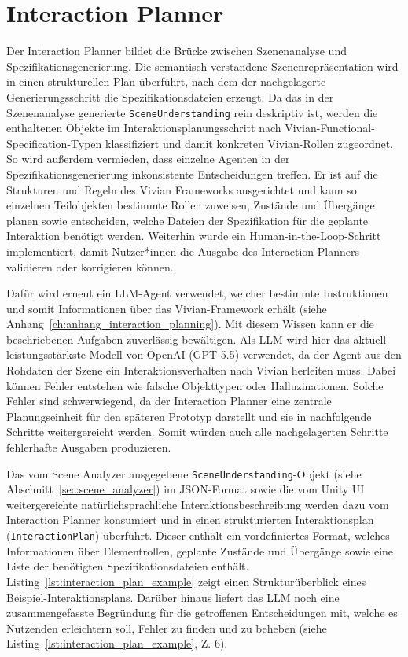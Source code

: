\section{Interaction Planner}\label{sec:interaction_planner}

Der Interaction Planner bildet die Brücke zwischen Szenenanalyse und Spezifikationsgenerierung.
Die semantisch verstandene Szenenrepräsentation wird in einen strukturellen Plan überführt, nach dem der nachgelagerte Generierungsschritt die Spezifikationsdateien erzeugt.
Da das in der Szenenanalyse generierte \texttt{SceneUnderstanding} rein deskriptiv ist, werden die enthaltenen Objekte im Interaktionsplanungsschritt nach Vivian-Functional-Specification-Typen klassifiziert und damit konkreten Vivian-Rollen zugeordnet.
So wird außerdem vermieden, dass einzelne Agenten in der Spezifikationsgenerierung inkonsistente Entscheidungen treffen.
Er ist auf die Strukturen und Regeln des Vivian Frameworks ausgerichtet und kann so einzelnen Teilobjekten bestimmte Rollen zuweisen, Zustände und Übergänge planen sowie entscheiden, welche Dateien der Spezifikation für die geplante Interaktion benötigt werden.
Weiterhin wurde ein Human-in-the-Loop-Schritt implementiert, damit Nutzer*innen die Ausgabe des Interaction Planners validieren oder korrigieren können.

Dafür wird erneut ein LLM-Agent verwendet, welcher bestimmte Instruktionen und somit Informationen über das Vivian-Framework erhält (siehe Anhang~\ref{ch:anhang_interaction_planning}).
Mit diesem Wissen kann er die beschriebenen Aufgaben zuverlässig bewältigen.
Als LLM wird hier das aktuell leistungsstärkste Modell von OpenAI (GPT-5.5) verwendet, da der Agent aus den Rohdaten der Szene ein Interaktionsverhalten nach Vivian herleiten muss.
Dabei können Fehler entstehen wie falsche Objekttypen oder Halluzinationen.
Solche Fehler sind schwerwiegend, da der Interaction Planner eine zentrale Planungseinheit für den späteren Prototyp darstellt und sie in nachfolgende Schritte weitergereicht werden.
Somit würden auch alle nachgelagerten Schritte fehlerhafte Ausgaben produzieren.

Das vom Scene Analyzer ausgegebene \texttt{SceneUnderstanding}-Objekt (siehe Abschnitt~\ref{sec:scene_analyzer}) im JSON-Format sowie die vom Unity UI weitergereichte natürlichsprachliche Interaktionsbeschreibung werden dazu vom Interaction Planner konsumiert und in einen strukturierten Interaktionsplan (\texttt{InteractionPlan}) überführt.
Dieser enthält ein vordefiniertes Format, welches Informationen über Elementrollen, geplante Zustände und Übergänge sowie eine Liste der benötigten Spezifikationsdateien enthält.
Listing~\ref{lst:interaction_plan_example} zeigt einen Strukturüberblick eines Beispiel-Interaktionsplans.
Darüber hinaus liefert das LLM noch eine zusammengefasste Begründung für die getroffenen Entscheidungen mit, welche es Nutzenden erleichtern soll, Fehler zu finden und zu beheben (siehe Listing~\ref{lst:interaction_plan_example}, Z. 6).

